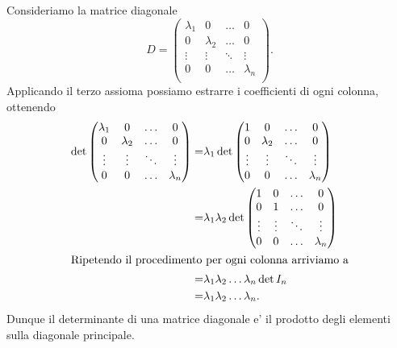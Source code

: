 Consideriamo la matrice diagonale \[
    D = \begin{pmatrix}
        \lambda_1   &0          &\dots  &0 \\
        0           &\lambda_2  &\dots  &0 \\
        \vdots      &\vdots     &\ddots &\vdots \\
        0           &0          &\dots  &\lambda_n \\
    \end{pmatrix}.    
\] Applicando il terzo assioma possiamo estrarre i coefficienti di ogni colonna, ottenendo
\begin{alignat*}{1}
    \det \begin{pmatrix}
        \lambda_1   &0          &\dots  &0 \\
        0           &\lambda_2  &\dots  &0 \\
        \vdots      &\vdots     &\ddots &\vdots \\
        0           &0          &\dots  &\lambda_n \\
    \end{pmatrix} = &\lambda_1 \det \begin{pmatrix}
        1           &0          &\dots  &0 \\
        0           &\lambda_2  &\dots  &0 \\
        \vdots      &\vdots     &\ddots &\vdots \\
        0           &0          &\dots  &\lambda_n \\
    \end{pmatrix} \\
    = &\lambda_1 \lambda_2 \det \begin{pmatrix}
        1           &0          &\dots  &0 \\
        0           &1          &\dots  &0 \\
        \vdots      &\vdots     &\ddots &\vdots \\
        0           &0          &\dots  &\lambda_n \\
    \end{pmatrix} \\
    \intertext{Ripetendo il procedimento per ogni colonna arriviamo a}
    = &\lambda_1 \lambda_2 \dots \lambda_n \det I_n \\
    = &\lambda_1 \lambda_2 \dots \lambda_n.
\end{alignat*}
Dunque il determinante di una matrice diagonale e' il prodotto degli elementi sulla diagonale principale.

